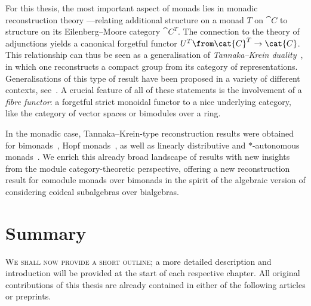 For this thesis,
the most important aspect of monads lies in
monadic reconstruction theory%
—relating additional structure on a monad \(T\) on \(\cat{C}\)
to structure on its Eilenberg–Moore category \(\cat{C}^T\).
The connection to the theory of adjunctions
yields a canonical forgetful functor \(U^T\from \cat{C}^T \to \cat{C}\).
This relationship can thus be seen as
a generalisation of \emph{Tannaka--Krein duality}~\cite{tannaka38:ueber-dualit-grupp,krein49:princ-ual-block-alg},
in which one reconstructs a compact group from its category of representations.
Generalisations of this type of result have been proposed in a variety of different contexts,
see~\cite{%
  saavedra72:categ,%
  woronowicz88:tannak-krein,%
  deligne90:categ,%
  lurie04:tannak-dualit-geomet-stack,%
  szlachanyi09:fiber-tannak,%
  schaeppi13:tannak%
}.
A crucial feature of all of these statements is the involvement of a \emph{fibre functor}:
a forgetful strict monoidal functor to a nice underlying category,
like the category of vector spaces or bimodules over a ring.

In the monadic case,
Tannaka--Krein-type reconstruction results were obtained for bimonads~\cite{Moerdijk2002,McCrudden2002},
Hopf monads~\cite{Bruguieres2007},
as well as linearly distributive and \(*\)\hyp{}autonomous monads~\cite{pastro09:closed,pastro12:note}.
We enrich this already broad landscape of results
with new insights from the module category\hyp{}theoretic perspective,
offering a new reconstruction result for comodule monads over bimonads
in the spirit of the algebraic version of considering coideal subalgebras over bialgebras.

\section{Summary}\label{sec:summary}

\textsc{We shall now provide a short outline};
a more detailed description and introduction will be provided at the start of each respective chapter.
All original contributions of this thesis are already contained in either of the following articles or preprints.%

